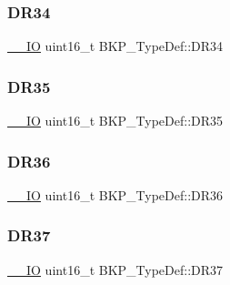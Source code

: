 \mbox{\label{struct_b_k_p___type_def_a0e6152e3a9ac3f0086df42cebb80832f}} 
\subsubsection{\texorpdfstring{DR34}{DR34}}
{\footnotesize\ttfamily \mbox{\hyperlink{group___c_m_s_i_s___c_m3__core__definitions_gaec43007d9998a0a0e01faede4133d6be}{\+\_\+\+\_\+\+IO}} uint16\+\_\+t B\+K\+P\+\_\+\+Type\+Def\+::\+D\+R34}

\mbox{\label{struct_b_k_p___type_def_a085a88cda3752b0f2248f40c3b552905}} 
\subsubsection{\texorpdfstring{DR35}{DR35}}
{\footnotesize\ttfamily \mbox{\hyperlink{group___c_m_s_i_s___c_m3__core__definitions_gaec43007d9998a0a0e01faede4133d6be}{\+\_\+\+\_\+\+IO}} uint16\+\_\+t B\+K\+P\+\_\+\+Type\+Def\+::\+D\+R35}

\mbox{\label{struct_b_k_p___type_def_a239295664cc073b3f3da282fa73dc3c6}} 
\subsubsection{\texorpdfstring{DR36}{DR36}}
{\footnotesize\ttfamily \mbox{\hyperlink{group___c_m_s_i_s___c_m3__core__definitions_gaec43007d9998a0a0e01faede4133d6be}{\+\_\+\+\_\+\+IO}} uint16\+\_\+t B\+K\+P\+\_\+\+Type\+Def\+::\+D\+R36}

\mbox{\label{struct_b_k_p___type_def_aa1f71e6639cfcc903c534596672fb007}} 
\subsubsection{\texorpdfstring{DR37}{DR37}}
{\footnotesize\ttfamily \mbox{\hyperlink{group___c_m_s_i_s___c_m3__core__definitions_gaec43007d9998a0a0e01faede4133d6be}{\+\_\+\+\_\+\+IO}} uint16\+\_\+t B\+K\+P\+\_\+\+Type\+Def\+::\+D\+R37}

